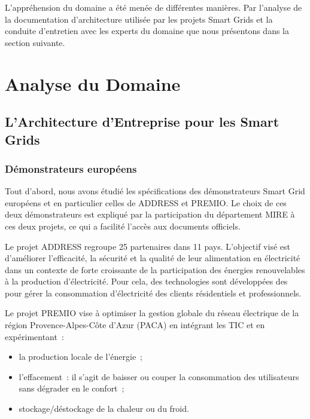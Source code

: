     L'appréhension du domaine a été menée de différentes manières. Par l'analyse
    de la documentation d'architecture utilisée par les projets Smart
    Grids et la conduite d'entretien avec les experts du domaine que
    nous présentons dans la  section suivante.





\section{Analyse du Domaine}

    \subsection{L'Architecture d'Entreprise pour les Smart Grids}
    \subsubsection{Démonstrateurs européens}
    \label{sec:DemonstrateursSG}

Tout d'abord, nous avons étudié les spécifications des démonstrateurs Smart Grid
européens et en particulier celles de ADDRESS et PREMIO. Le choix de ces deux
démonstrateurs est expliqué par la participation du département MIRE à ces deux
projets, ce qui a facilité l'accès aux documents officiels.



Le projet ADDRESS regroupe 25 partenaires dans 11 pays. L'objectif visé est
d'améliorer l'efficacité, la sécurité et la qualité de leur alimentation en
électricité dans un contexte de forte croissante de la participation des
énergies renouvelables à la production d'électricité. Pour cela, des
technologies sont développées des pour gérer la consommation d'électricité des
clients résidentiels et professionnels.

Le projet PREMIO vise à optimiser la gestion globale du réseau électrique de la
région Provence-Alpes-Côte d'Azur (PACA) en intégrant les TIC et en
expérimentant~:
\begin{itemize}
	\item la production locale de l'énergie~;
	\item l'effacement~: il s'agit de baisser ou couper la consommation des utilisateurs
sans dégrader en le confort~;
	\item stockage/déstockage de la chaleur ou du froid.
\end{itemize}


